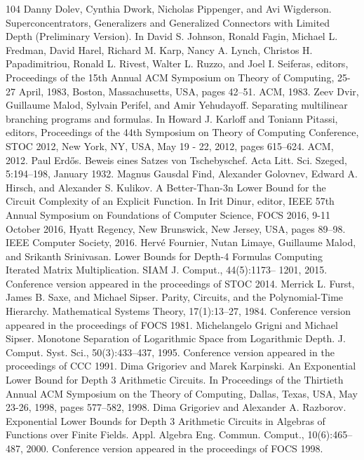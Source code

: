 \documentclass[10pt,a4paper]{article}
\begin{document}
\begin{thebibliography}{104}
 Danny Dolev, Cynthia Dwork, Nicholas Pippenger, and Avi Wigderson. Superconcentrators, Generalizers and Generalized Connectors with Limited Depth (Preliminary Version). In David S. Johnson, Ronald Fagin, Michael L. Fredman, David Harel, Richard M. Karp, Nancy A. Lynch, Christos H. Papadimitriou, Ronald L. Rivest, Walter L. Ruzzo, and Joel I. Seiferas, editors, Proceedings of the 15th Annual ACM Symposium on Theory of Computing, 25-27 April, 1983, Boston, Massachusetts, USA, pages 42–51. ACM, 1983.
 Zeev Dvir, Guillaume Malod, Sylvain Perifel, and Amir Yehudayoff. Separating multilinear branching programs and formulas. In Howard J. Karloff and Toniann Pitassi, editors, Proceedings of the 44th Symposium on Theory of Computing Conference, STOC 2012, New York, NY, USA, May 19 - 22, 2012, pages 615–624. ACM, 2012.
 Paul Erdős. Beweis eines Satzes von Tschebyschef. Acta Litt. Sci. Szeged, 5:194–198, January 1932.
 Magnus Gausdal Find, Alexander Golovnev, Edward A. Hirsch, and Alexander S. Kulikov. A Better-Than-3n Lower Bound for the Circuit Complexity of an Explicit Function. In Irit Dinur, editor, IEEE 57th Annual Symposium on Foundations of Computer Science, FOCS 2016, 9-11 October 2016, Hyatt Regency, New Brunswick, New Jersey, USA, pages 89–98. IEEE Computer Society, 2016.
 Hervé Fournier, Nutan Limaye, Guillaume Malod, and Srikanth Srinivasan. Lower Bounds for Depth-4 Formulas Computing Iterated Matrix Multiplication. SIAM J. Comput., 44(5):1173– 1201, 2015. Conference version appeared in the proceedings of STOC 2014.
 Merrick L. Furst, James B. Saxe, and Michael Sipser. Parity, Circuits, and the Polynomial-Time Hierarchy. Mathematical Systems Theory, 17(1):13–27, 1984. Conference version appeared in the proceedings of FOCS 1981.
 Michelangelo Grigni and Michael Sipser. Monotone Separation of Logarithmic Space from Logarithmic Depth. J. Comput. Syst. Sci., 50(3):433–437, 1995. Conference version appeared in the proceedings of CCC 1991.
 Dima Grigoriev and Marek Karpinski. An Exponential Lower Bound for Depth 3 Arithmetic Circuits. In Proceedings of the Thirtieth Annual ACM Symposium on the Theory of Computing, Dallas, Texas, USA, May 23-26, 1998, pages 577–582, 1998.
 Dima Grigoriev and Alexander A. Razborov. Exponential Lower Bounds for Depth 3 Arithmetic Circuits in Algebras of Functions over Finite Fields. Appl. Algebra Eng. Commun. Comput., 10(6):465–487, 2000. Conference version appeared in the proceedings of FOCS 1998.

\end{thebibliography}
\end{document}
